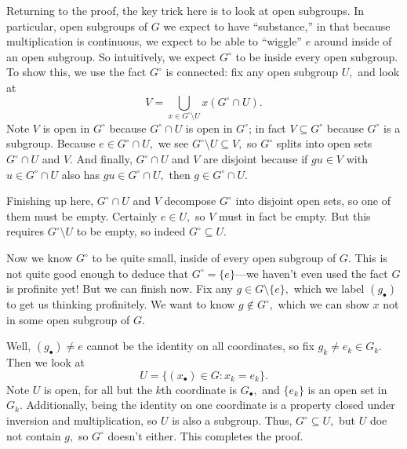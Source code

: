 Returning to the proof, the key trick here is to look at open subgroups. In particular, open subgroups of $G$ we expect to have ``substance,'' in that because multiplication is continuous, we expect to be able to ``wiggle'' $e$ around inside of an open subgroup. So intuitively, we expect $G^\circ$ to be inside every open subgroup. To show this, we use the fact $G^\circ$ is connected: fix any open subgroup $U,$ and look at
\[V=\bigcup_{x\in G^\circ\setminus U}x(G^\circ\cap U).\]
Note $V$ is open in $G^\circ$ because $G^\circ\cap U$ is open in $G^\circ$; in fact $V\subseteq G^\circ$ because $G^\circ$ is a subgroup. Because $e\in G^\circ\cap U,$ we see $G^\circ\setminus U\subseteq V,$ so $G^\circ$ splits into open sets $G^\circ\cap U$ and $V.$ And finally, $G^\circ\cap U$ and $V$ are disjoint because if $gu\in V$ with $u\in G^\circ\cap U$ also has $gu\in G^\circ\cap U,$ then $g\in G^\circ\cap U.$

Finishing up here, $G^\circ\cap U$ and $V$ decompose $G^\circ$ into disjoint open sets, so one of them must be empty. Certainly $e\in U,$ so $V$ must in fact be empty. But this requires $G^\circ\setminus U$ to be empty, so indeed $G^\circ\subseteq U.$

Now we know $G^\circ$ to be quite small, inside of every open subgroup of $G.$ This is not quite good enough to deduce that $G^\circ=\{e\}$---we haven't even used the fact $G$ is profinite yet! But we can finish now. Fix any $g\in G\setminus\{e\},$ which we label $(g_\bullet)$ to get us thinking profinitely. We want to know $g\not\in G^\circ,$ which we can show $x$ not in some open subgroup of $G.$

Well, $(g_\bullet)\ne e$ cannot be the identity on all coordinates, so fix $g_k\ne e_k\in G_k.$ Then we look at
\[U=\{(x_\bullet)\in G:x_k=e_k\}.\]
Note $U$ is open, for all but the $k$th coordinate is $G_\bullet,$ and $\{e_k\}$ is an open set in $G_k.$ Additionally, being the identity on one coordinate is a property closed under inversion and multiplication, so $U$ is also a subgroup. Thus, $G^\circ\subseteq U,$ but $U$ doe not contain $g,$ so $G^\circ$ doesn't either. This completes the proof.

